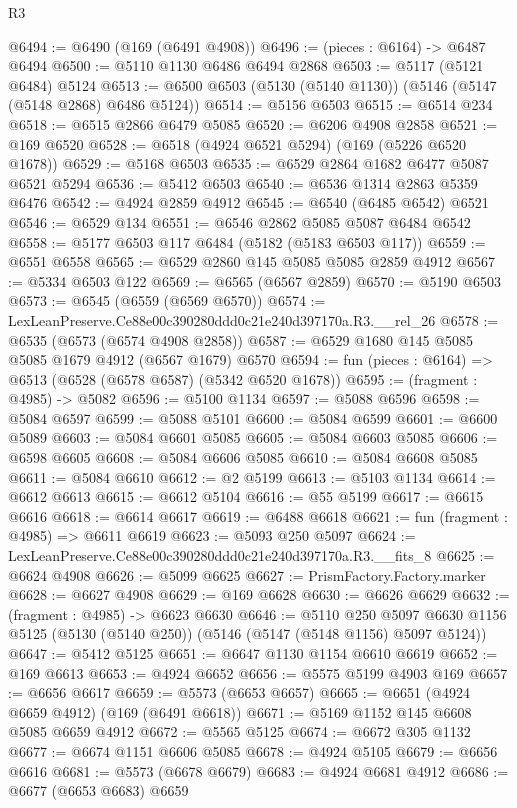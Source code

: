 \begin{lexlean}{R3}
\begin{coremodule}
@6494 := @6490 (@169 (@6491 @4908))
@6496 := (pieces : @6164) -> @6487 @6494
@6500 := @5110 @1130 @6486 @6494 @2868
@6503 := @5117 (@5121 @6484) @5124
@6513 := @6500 @6503 (@5130 (@5140 @1130)) (@5146 (@5147 (@5148 @2868) @6486 @5124))
@6514 := @5156 @6503
@6515 := @6514 @234
@6518 := @6515 @2866 @6479 @5085
@6520 := @6206 @4908 @2858
@6521 := @169 @6520
@6528 := @6518 (@4924 @6521 @5294) (@169 (@5226 @6520 @1678))
@6529 := @5168 @6503
@6535 := @6529 @2864 @1682 @6477 @5087 @6521 @5294
@6536 := @5412 @6503
@6540 := @6536 @1314 @2863 @5359 @6476
@6542 := @4924 @2859 @4912
@6545 := @6540 (@6485 @6542) @6521
@6546 := @6529 @134
@6551 := @6546 @2862 @5085 @5087 @6484 @6542
@6558 := @5177 @6503 @117 @6484 (@5182 (@5183 @6503 @117))
@6559 := @6551 @6558
@6565 := @6529 @2860 @145 @5085 @5085 @2859 @4912
@6567 := @5334 @6503 @122
@6569 := @6565 (@6567 @2859)
@6570 := @5190 @6503
@6573 := @6545 (@6559 (@6569 @6570))
@6574 := LexLeanPreserve.Ce88e00c390280ddd0c21e240d397170a.R3.__rel_26
@6578 := @6535 (@6573 (@6574 @4908 @2858))
@6587 := @6529 @1680 @145 @5085 @5085 @1679 @4912 (@6567 @1679) @6570
@6594 := fun (pieces : @6164) => @6513 (@6528 (@6578 @6587) (@5342 @6520 @1678))
@6595 := (fragment : @4985) -> @5082
@6596 := @5100 @1134
@6597 := @5088 @6596
@6598 := @5084 @6597
@6599 := @5088 @5101
@6600 := @5084 @6599
@6601 := @6600 @5089
@6603 := @5084 @6601 @5085
@6605 := @5084 @6603 @5085
@6606 := @6598 @6605
@6608 := @5084 @6606 @5085
@6610 := @5084 @6608 @5085
@6611 := @5084 @6610
@6612 := @2 @5199
@6613 := @5103 @1134
@6614 := @6612 @6613
@6615 := @6612 @5104
@6616 := @55 @5199
@6617 := @6615 @6616
@6618 := @6614 @6617
@6619 := @6488 @6618
@6621 := fun (fragment : @4985) => @6611 @6619
@6623 := @5093 @250 @5097
@6624 := LexLeanPreserve.Ce88e00c390280ddd0c21e240d397170a.R3.__fits_8
@6625 := @6624 @4908
@6626 := @5099 @6625
@6627 := PrismFactory.Factory.marker
@6628 := @6627 @4908
@6629 := @169 @6628
@6630 := @6626 @6629
@6632 := (fragment : @4985) -> @6623 @6630
@6646 := @5110
    @250
    @5097
    @6630
    @1156
    @5125
    (@5130 (@5140 @250))
    (@5146 (@5147 (@5148 @1156) @5097 @5124))
@6647 := @5412 @5125
@6651 := @6647 @1130 @1154 @6610 @6619
@6652 := @169 @6613
@6653 := @4924 @6652
@6656 := @5575 @5199 @4903 @169
@6657 := @6656 @6617
@6659 := @5573 (@6653 @6657)
@6665 := @6651 (@4924 @6659 @4912) (@169 (@6491 @6618))
@6671 := @5169 @1152 @145 @6608 @5085 @6659 @4912
@6672 := @5565 @5125
@6674 := @6672 @305 @1132
@6677 := @6674 @1151 @6606 @5085
@6678 := @4924 @5105
@6679 := @6656 @6616
@6681 := @5573 (@6678 @6679)
@6683 := @4924 @6681 @4912
@6686 := @6677 (@6653 @6683) @6659

\end{coremodule}
\end{lexlean}
